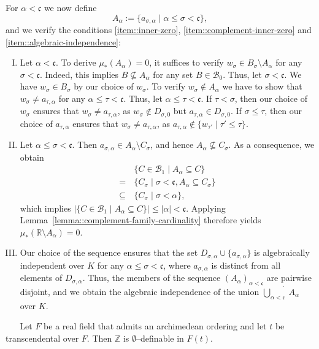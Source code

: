  For $\alpha<\mathfrak{c}$ we now define
 $$A_\alpha:=\{a_{\sigma,\alpha}\mid \alpha\leq\sigma<\mathfrak{c}\},$$
 and we verify the conditions \eqref{item::inner-zero}, \eqref{item::complement-inner-zero} and \eqref{item::algebraic-independence}:
 \begin{enumerate}[(I)]
\item Let $\alpha<\mathfrak{c}$. To derive $\mu_*(A_\alpha)=0$, it suffices to verify $w_\sigma\in B_\sigma\setminus A_\alpha$ for any $\sigma<\mathfrak{c}$. Indeed, this implies $B\not\subseteq A_\alpha$ for any set $B\in\mathcal{B}_0$. Thus, let $\sigma<\mathfrak{c}$. We have $w_\sigma\in B_\sigma$ by our choice of $w_\sigma$. To verify $w_\sigma\notin A_\alpha$ we have to show that $w_\sigma\neq a_{\tau,\alpha}$ for any $\alpha\leq\tau<\mathfrak{c}$. Thus, let $\alpha\leq\tau<\mathfrak{c}$. If $\tau<\sigma$, then our choice of $w_\sigma$ ensures that $w_\sigma\neq a_{\tau,\alpha}$, as $w_\sigma\notin D_{\sigma,0}$ but $a_{\tau,\alpha}\in D_{\sigma,0}$. If $\sigma\leq\tau$, then our choice of $a_{\tau,\alpha}$ ensures that $w_\sigma\neq a_{\tau,\alpha}$, as
$a_{\tau,\alpha}\notin\{w_{\tau'}\mid \tau'\leq \tau\}$.
    
\item Let $\alpha\leq\sigma<\mathfrak{c}$. Then $a_{\sigma,\alpha}\in A_\alpha\setminus C_\sigma$, and hence $A_\alpha\not\subseteq C_\sigma$. As a consequence, we obtain
\begin{align*}
  &\,\{C\in\mathcal{B}_1\mid A_\alpha\subseteq C\}\\
  =&\,\{C_\sigma\mid \sigma<\mathfrak{c}, A_\alpha\subseteq C_\sigma\} \\
  \subseteq&\,\{C_\sigma\mid \sigma<\alpha\},
\end{align*}
which implies $|\{C\in\mathcal{B}_1\mid A_\alpha\subseteq C\}|\leq|\alpha|<\mathfrak{c}$. Applying Lemma~\ref{lemma::complement-family-cardinality} therefore yields $\mu_*(\mathbb{R}\setminus A_\alpha)=0$.
    
\item Our choice of the sequence ensures that the set $D_{\sigma,\alpha}\cup\{a_{\sigma,\alpha}\}$ is algebraically independent over $K$ for any $\alpha\leq\sigma<\mathfrak{c}$, where $a_{\sigma,\alpha}$ is distinct from all elements of $D_{\sigma,\alpha}$. Thus, the members of the sequence $(A_\alpha)_{\alpha<{\mathfrak{c}}}$ are pairwise disjoint, and we obtain the algebraic independence of the union $\dot{\bigcup\limits_{\alpha<\mathfrak{c}}}\,A_\alpha$
over $K$. \qedhere
 \end{enumerate}


\begin{fact}\label{fact::robinson}
    Let $F$ be a real field that admits an archimedean ordering and let $t$ be transcendental over $F$. Then $\mathbb{Z}$ is $\emptyset$--definable in $F(t)$.
\end{fact}

